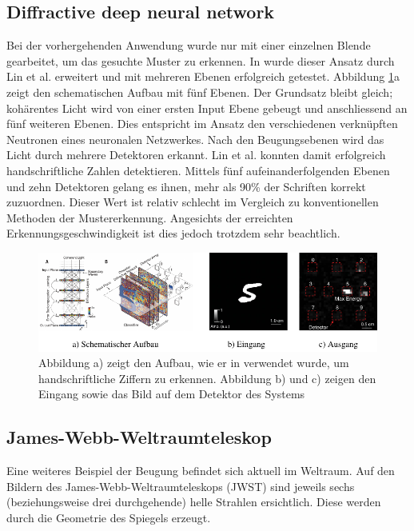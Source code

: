 \subsection{Diffractive deep neural network}
Bei der vorhergehenden Anwendung wurde nur mit einer einzelnen Blende gearbeitet, um das gesuchte Muster zu erkennen.
In \cite{opt:Lin.2018} wurde dieser Ansatz durch Lin et al. erweitert und mit mehreren Ebenen erfolgreich getestet.
Abbildung \ref{opt:fig:handwriting}a zeigt den schematischen Aufbau mit fünf Ebenen.
Der Grundsatz bleibt gleich; kohärentes Licht wird von einer ersten Input Ebene gebeugt und anschliessend an fünf weiteren Ebenen.
Dies entspricht im Ansatz den verschiedenen verknüpften Neutronen eines neuronalen Netzwerkes.
Nach den Beugungsebenen wird das Licht durch mehrere Detektoren erkannt.
Lin et al. konnten damit erfolgreich handschriftliche Zahlen detektieren.
Mittels fünf aufeinanderfolgenden Ebenen und zehn Detektoren gelang es ihnen, mehr als 90\% der Schriften korrekt zuzuordnen.
Dieser Wert ist relativ schlecht im Vergleich zu konventionellen Methoden der Mustererkennung.
Angesichts der erreichten Erkennungsgeschwindigkeit ist dies jedoch trotzdem sehr beachtlich.

\begin{figure}
    \centering
    \includegraphics[width=\textwidth]{papers/opt/images/handwriting.pdf}
    \caption{Abbildung a) zeigt den Aufbau, wie er in \cite{opt:Lin.2018} verwendet wurde, um handschriftliche Ziffern zu erkennen.
    Abbildung b) und c) zeigen den Eingang sowie das Bild auf dem Detektor des Systems}
    \label{opt:fig:handwriting}
\end{figure}

\subsection{James-Webb-Weltraumteleskop}
Eine weiteres Beispiel der Beugung befindet sich aktuell im Weltraum.
Auf den Bildern des James-Webb-Weltraumteleskops (JWST) sind jeweils sechs (beziehungsweise drei durchgehende) helle Strahlen ersichtlich.
Diese werden durch die Geometrie des Spiegels erzeugt.

